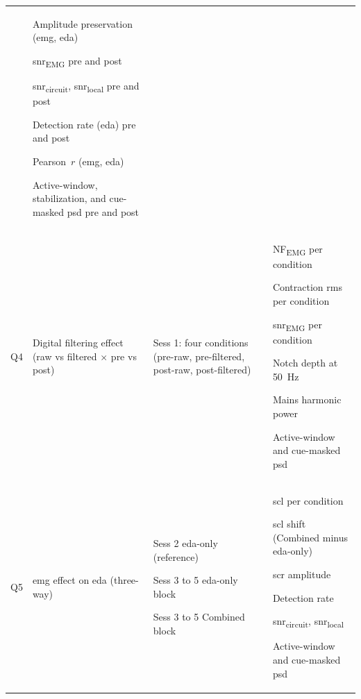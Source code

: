 {\begin{xltabular}{\widetable}{>{\centering\arraybackslash}p{0.5cm} >{\raggedright\arraybackslash}p{2.4cm} >{\raggedright\arraybackslash}p{2.8cm} >{\raggedright\arraybackslash}X}
\begin{tabitemize}
\end{tabitemize} &
\begin{tabitemize}
  \item Amplitude preservation (\gls{emg}, \gls{eda})
  \item \gls{snr}\textsubscript{EMG} pre and post
  \item \gls{snr}\textsubscript{circuit}, \gls{snr}\textsubscript{local} pre and post
  \item Detection rate (\gls{eda}) pre and post
  \item Pearson~$r$ (\gls{emg}, \gls{eda})
  \item Active-window, stabilization, and cue-masked \gls{psd} pre and post
\end{tabitemize} \\
\addlinespace
Q4 & Digital filtering effect (raw vs filtered $\times$ pre vs post) &
Sess 1: four conditions (pre-raw, pre-filtered, post-raw, post-filtered) &
\begin{tabitemize}
  \item NF\textsubscript{EMG} per condition
  \item Contraction \gls{rms} per condition
  \item \gls{snr}\textsubscript{EMG} per condition
  \item Notch depth at \SI{50}{\hertz}
  \item Mains harmonic power
  \item Active-window and cue-masked \gls{psd}
\end{tabitemize} \\
\addlinespace
Q5 & \gls{emg} effect on \gls{eda} (three-way) &
\begin{tabitemize}
  \item Sess 2 \gls{eda}-only (reference)
  \item Sess 3 to 5 \gls{eda}-only block
  \item Sess 3 to 5 Combined block
\end{tabitemize} &
\begin{tabitemize}
  \item \gls{scl} per condition
  \item \gls{scl} shift (Combined minus \gls{eda}-only)
  \item \gls{scr} amplitude
  \item Detection rate
  \item \gls{snr}\textsubscript{circuit}, \gls{snr}\textsubscript{local}
  \item Active-window and cue-masked \gls{psd}

\end{tabitemize}
\end{xltabular}}
